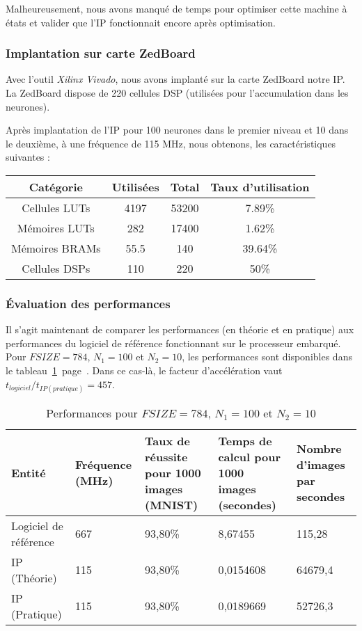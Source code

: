 Malheureusement, nous avons manqué de temps pour optimiser cette machine à états
et valider que l'IP fonctionnait encore après optimisation.

\subsubsection{Implantation sur carte ZedBoard}

Avec l'outil {\em Xilinx Vivado}, nous avons implanté sur la carte ZedBoard notre IP.
La ZedBoard dispose de 220 cellules DSP (utilisées pour l'accumulation dans les neurones).

Après implantation de l'IP pour 100 neurones dans le premier niveau et 10 dans le deuxième,
à une fréquence de 115 MHz, nous obtenons, les caractéristiques suivantes :

\begin{table}[h!]
	\centering
	\begin{tabular}{|c|c|c|c|}
		\hline
		Catégorie & Utilisées & Total & Taux d'utilisation\\
		\hline
		Cellules LUTs & 4197 & 53200 & 7.89\% \\
		Mémoires LUTs & 282 & 17400 & 1.62\% \\
		Mémoires BRAMs & 55.5 & 140 & 39.64\% \\
		Cellules DSPs & 110 & 220 & 50\% \\
		\hline
	\end{tabular}
\end{table}


\subsubsection{\'{E}valuation des performances}

Il s'agit maintenant de comparer les performances (en théorie et en pratique)
aux performances du logiciel de référence fonctionnant sur le processeur embarqué.\\

Pour $FSIZE = 784$, $N_1 = 100$ et $N_2 = 10$, les performances sont disponibles
dans le tableau~\ref{fig:perf_100}~page~\pageref{fig:perf_100}.
Dans ce cas-là, le facteur d'accélération vaut $t_{logiciel}/t_{IP (pratique)} = 457$.\\
\begin{table}[h!]
	\centering
	\begin{tabular}{| p{} | p{} | p{} | p{} | p{} |}
		\hline
		Entité & Fréquence (MHz) & Taux de réussite pour 1000 images (MNIST) & Temps de calcul pour 1000 images (secondes) & Nombre d'images par secondes\\
		\hline
		Logiciel de référence & 667 & 93,80\% &  8,67455 & 115,28\\
		IP (Théorie) & 115 &  93,80\% & 0,0154608 & 64679,4\\
		IP (Pratique) & 115 &  93,80\% & 0,0189669 & 52726,3\\
		\hline
	\end{tabular}
	\caption{Performances pour $FSIZE = 784$, $N_1 = 100$ et $N_2 = 10$}
	\label{fig:perf_100}
\end{table}
